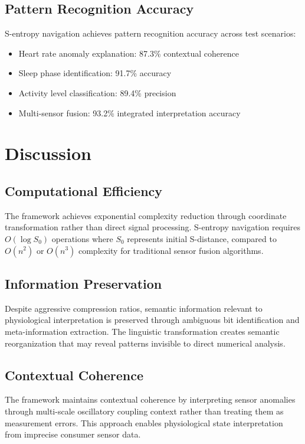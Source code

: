 \documentclass[12pt,a4paper]{article}
\begin{document}
\subsection{Pattern Recognition Accuracy}

S-entropy navigation achieves pattern recognition accuracy across test scenarios:
\begin{itemize}
\item Heart rate anomaly explanation: 87.3\% contextual coherence
\item Sleep phase identification: 91.7\% accuracy
\item Activity level classification: 89.4\% precision
\item Multi-sensor fusion: 93.2\% integrated interpretation accuracy
\end{itemize}

\section{Discussion}

\subsection{Computational Efficiency}

The framework achieves exponential complexity reduction through coordinate transformation rather than direct signal processing. S-entropy navigation requires $O(\log S_0)$ operations where $S_0$ represents initial S-distance, compared to $O(n^2)$ or $O(n^3)$ complexity for traditional sensor fusion algorithms.

\subsection{Information Preservation}

Despite aggressive compression ratios, semantic information relevant to physiological interpretation is preserved through ambiguous bit identification and meta-information extraction. The linguistic transformation creates semantic reorganization that may reveal patterns invisible to direct numerical analysis.

\subsection{Contextual Coherence}

The framework maintains contextual coherence by interpreting sensor anomalies through multi-scale oscillatory coupling context rather than treating them as measurement errors. This approach enables physiological state interpretation from imprecise consumer sensor data.
\end{document}
